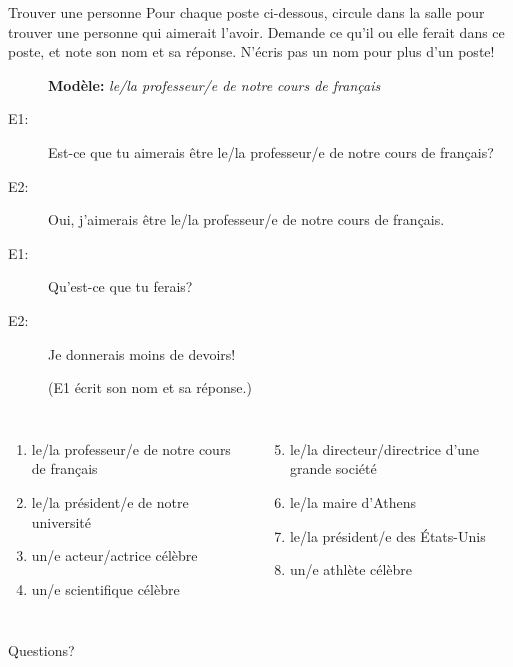 \documentclass{beamer}
\begin{document}
  \begin{frame}{Trouver une personne}
    \scriptsize
    Pour chaque poste ci-dessous, circule dans la salle pour trouver une personne qui aimerait l'avoir.
    Demande ce qu'il ou elle ferait dans ce poste, et note son nom et sa réponse.
    N'écris pas un nom pour plus d'un poste!
    \begin{description}
      \item[] \textbf{Modèle:} \emph{le/la professeur/e de notre cours de français}
      \item[E1:] Est-ce que tu aimerais être le/la professeur/e de notre cours de français?
      \item[E2:] Oui, j'aimerais être le/la professeur/e de notre cours de français.
      \item[E1:] Qu'est-ce que tu ferais?
      \item[E2:] Je donnerais moins de devoirs!
      \item[] (E1 écrit son nom et sa réponse.)
    \end{description}
    \begin{columns}[t]
        \begin{enumerate}
          \item le/la professeur/e de notre cours de français
          \item le/la président/e de notre université
          \item un/e acteur/actrice célèbre
          \item un/e scientifique célèbre
        \end{enumerate}
        \begin{enumerate}
          \setcounter{enumi}{4}
          \item le/la directeur/directrice d'une grande société
          \item le/la maire d'Athens
          \item le/la président/e des États-Unis
          \item un/e athlète célèbre
        \end{enumerate}
    \end{columns}
  \end{frame}

  \begin{frame}{}
    \begin{center}
      \Large Questions?
    \end{center}
  \end{frame}
\end{document}
